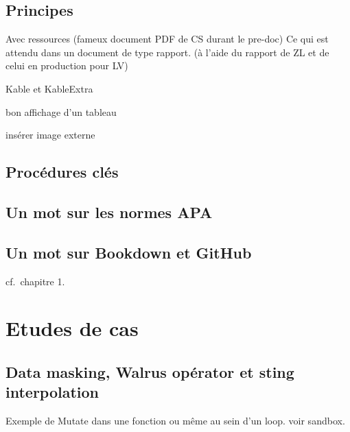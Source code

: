 \documentclass[
  letterpaper,
  DIV=11,
  numbers=noendperiod]{scrreprt}
\begin{document}
\hypertarget{principes-1}{%
\section{Principes}\label{principes-1}}

Avec ressources (fameux document PDF de CS durant le pre-doc) Ce qui est
attendu dans un document de type rapport. (à l'aide du rapport de ZL et
de celui en production pour LV)

Kable et KableExtra

bon affichage d'un tableau

insérer image externe

\hypertarget{procuxe9dures-cluxe9s}{%
\section{Procédures clés}\label{procuxe9dures-cluxe9s}}

\hypertarget{un-mot-sur-les-normes-apa}{%
\section{Un mot sur les normes APA}\label{un-mot-sur-les-normes-apa}}

\hypertarget{un-mot-sur-bookdown-et-github}{%
\section{Un mot sur Bookdown et
GitHub}\label{un-mot-sur-bookdown-et-github}}

cf.~chapitre 1.


\hypertarget{etudes-de-cas}{%
\chapter{Etudes de cas}\label{etudes-de-cas}}

\hypertarget{data-masking-walrus-opuxe9rator-et-sting-interpolation}{%
\section{Data masking, Walrus opérator et sting
interpolation}\label{data-masking-walrus-opuxe9rator-et-sting-interpolation}}

Exemple de Mutate dans une fonction ou même au sein d'un loop. voir
sandbox.
\end{document}
